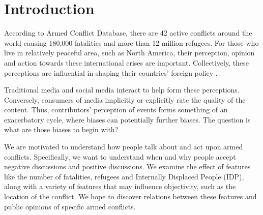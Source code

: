\section{Introduction}
According to Armed Conflict Database, there are 42 active conflicts around the world causing 180,000 fatalities and more than 12 million refugees. For those who live in relatively peaceful area, such as North America, their perception, opinion and action towards these international crises are important. Collectively, these perceptions are influential in shaping their countries' foreign policy \cite{Gelpi2009}. 

Traditional media and social media interact to help form these perceptions. Conversely, consumers of media implicitly or explicitly rate the quality of the content. Thus, contributors' perception of events forms something of an exacerbatory cycle, where biases can potentially further biases. The question is what are those biases to begin with?

We are motivated to understand how people talk about and act upon armed conflicts. Specifically, we want to understand when and why people accept negative discussions and positive discussions. We examine the effect of features like the number of fatalities, refugees and Internally Displaced People (IDP),  along with a variety of features that may influence objectivity, such as the location of the conflict. We hope to discover relations between these features and public opinions of specific armed conflicts.

